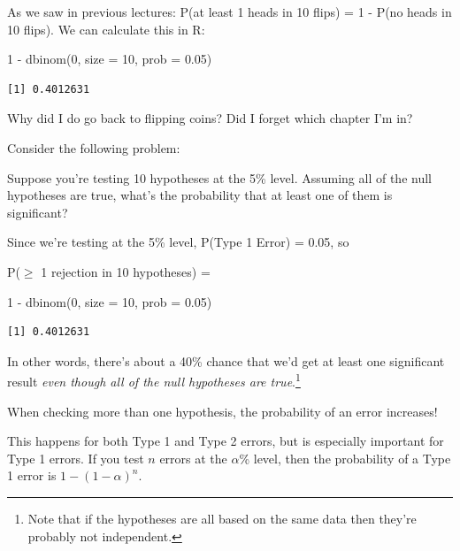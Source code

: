 \documentclass[
  letterpaper,
  DIV=11,
  numbers=noendperiod,
  oneside]{scrreprt}
\newenvironment{Shaded}{\begin{snugshade}}{\end{snugshade}}
\newcommand{\AttributeTok}[1]{\textcolor[rgb]{0.40,0.45,0.13}{#1}}
\newcommand{\DecValTok}[1]{\textcolor[rgb]{0.68,0.00,0.00}{#1}}
\newcommand{\FloatTok}[1]{\textcolor[rgb]{0.68,0.00,0.00}{#1}}
\newcommand{\FunctionTok}[1]{\textcolor[rgb]{0.28,0.35,0.67}{#1}}
\newcommand{\NormalTok}[1]{\textcolor[rgb]{0.00,0.23,0.31}{#1}}
\newcommand{\SpecialCharTok}[1]{\textcolor[rgb]{0.37,0.37,0.37}{#1}}
\begin{document}
As we saw in previous lectures: P(at least 1 heads in 10 flips) = 1 -
P(no heads in 10 flips). We can calculate this in R:

\begin{Shaded}
\begin{Highlighting}[]
\DecValTok{1} \SpecialCharTok{{-}} \FunctionTok{dbinom}\NormalTok{(}\DecValTok{0}\NormalTok{, }\AttributeTok{size =} \DecValTok{10}\NormalTok{, }\AttributeTok{prob =} \FloatTok{0.05}\NormalTok{)}
\end{Highlighting}
\end{Shaded}

\begin{verbatim}
[1] 0.4012631
\end{verbatim}

Why did I do go back to flipping coins? Did I forget which chapter I'm
in?

Consider the following problem:

Suppose you're testing 10 hypotheses at the 5\% level. Assuming all of
the null hypotheses are true, what's the probability that at least one
of them is significant?

Since we're testing at the 5\% level, P(Type 1 Error) = 0.05, so

P(\(\ge\) 1 rejection in 10 hypotheses) =

\begin{Shaded}
\begin{Highlighting}[]
\DecValTok{1} \SpecialCharTok{{-}} \FunctionTok{dbinom}\NormalTok{(}\DecValTok{0}\NormalTok{, }\AttributeTok{size =} \DecValTok{10}\NormalTok{, }\AttributeTok{prob =} \FloatTok{0.05}\NormalTok{)}
\end{Highlighting}
\end{Shaded}

\begin{verbatim}
[1] 0.4012631
\end{verbatim}

In other words, there's about a 40\% chance that we'd get at least one
significant result \emph{even though all of the null hypotheses are
true}.\footnote{Note that if the hypotheses are all based on the same
  data then they're probably not independent.}

\begin{tcolorbox}[enhanced jigsaw, toprule=.15mm, colbacktitle=quarto-callout-important-color!10!white, title=\textcolor{quarto-callout-important-color}{\faExclamation}\hspace{0.5em}{The Multiple Comparisons Problem}, arc=.35mm, colframe=quarto-callout-important-color-frame, colback=white, titlerule=0mm, left=2mm, bottomtitle=1mm, bottomrule=.15mm, breakable, opacitybacktitle=0.6, leftrule=.75mm, toptitle=1mm, coltitle=black, rightrule=.15mm, opacityback=0]

When checking more than one hypothesis, the probability of an error
increases!

This happens for both Type 1 and Type 2 errors, but is especially
important for Type 1 errors. If you test \(n\) errors at the
\(\alpha\)\% level, then the probability of a Type 1 error is
\(1 -(1 - \alpha)^n\).

\end{tcolorbox}
\end{document}

